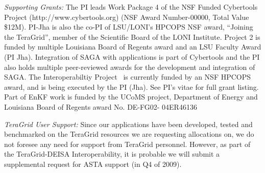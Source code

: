 \documentclass[a4paper,10pt]{article}
\begin{document}
{\it Supporting Grants:} The PI leads Work Package 4 of the NSF Funded Cybertools Project (http://www.cybertools.org) (NSF Award Number-00000, Total Value \$12M).  PI-Jha is also the co-PI of LSU/LONI's HPCOPS NSF award, ``Joining the TeraGrid'', member of the Scientific Board of the LONI Institute.  Project 2 is funded by multiple Louisiana Board of Regents award and an LSU Faculty Award (PI Jha). Integration of SAGA with applications is part of Cybertools and the PI also holds multiple peer-reviewed awards for the development and integration of SAGA.  The Interoperabiltiy Project~\cite{interop_url} is currently funded by an NSF HPCOPS award, and is being executed by the PI (Jha). See PI's vitae for full grant listing. Part of EnKF work is funded by the UCoMS project, Department of Energy and Louisiana Board of Regents award No. DE-FG02- 04ER46136

{\it TeraGrid User Support:} Since our applications have been developed, tested and benchmarked on the TeraGrid resources we are requesting allocations on, we do not foresee any need for support from TeraGrid personnel. However, as part of the TeraGrid-DEISA Interoperability, it is probable we will submit a supplemental request for ASTA support (in Q4 of 2009).





\end{document}
